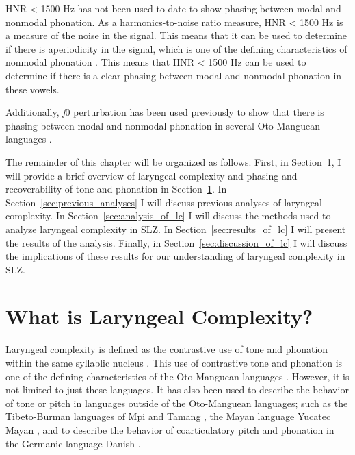 HNR < 1500 Hz has not been used to date to show phasing between modal and nonmodal phonation. As a harmonics-to-noise ratio measure, HNR < 1500 Hz is a measure of the noise in the signal. This means that it can be used to determine if there is aperiodicity in the signal, which is one of the defining characteristics of nonmodal phonation \citep{ladefogedSoundsWorldsLanguages1996}. This means that HNR < 1500 Hz can be used to determine if there is a clear phasing between modal and nonmodal phonation in these vowels. 

Additionally, \textit{f}0 perturbation has been used previously to show that there is phasing between modal and nonmodal phonation in several Oto-Manguean languages \citep{garellekAcousticConsequencesPhonation2011,dicanioCoarticulationToneGlottal2012,keltererPhonationTypeContrasts2020}. 

The remainder of this chapter will be organized as follows. First, in Section~\ref{sec:what_is_lc}, I will provide a brief overview of laryngeal complexity and phasing and recoverability of tone and phonation in Section~\ref{sec:what_is_lc}. In Section~\ref{sec:previous_analyses} I will discuss previous analyses of laryngeal complexity. In Section~\ref{sec:analysis_of_lc} I will discuss the methods used to analyze laryngeal complexity in SLZ. In Section~\ref{sec:results_of_lc} I will present the results of the analysis. Finally, in Section~\ref{sec:discussion_of_lc} I will discuss the implications of these results for our understanding of laryngeal complexity in SLZ.

\section{What is Laryngeal Complexity?}\label{sec:what_is_lc}

Laryngeal complexity is defined as the contrastive use of tone and phonation within the same syllablic nucleus \citep{blankenshipTimeCourseBreathiness1997,blankenshipTimingNonmodalPhonation2002,silvermanLaryngealComplexityOtomanguean1997,silvermanPhasingRecoverability1997}. This use of contrastive tone and phonation is one of the defining characteristics of the Oto-Manguean languages \citep{silvermanLaryngealComplexityOtomanguean1997}. However, it is not limited to just these languages. It has also been used to describe the behavior of tone or pitch in languages outside of the Oto-Manguean languages; such as the Tibeto-Burman languages of Mpi and Tamang \citep{silvermanLaryngealComplexityOtomanguean1997,silvermanPhasingRecoverability1997}, the Mayan language Yucatec Mayan \citep{frazierPhoneticsYucatecMaya2013}, and to describe the behavior of coarticulatory pitch and phonation in the Germanic language Danish \citep{frazierPhoneticsYucatecMaya2013,penaStodTimingDomain2022,penaProductionPerceptionStod2024}.

